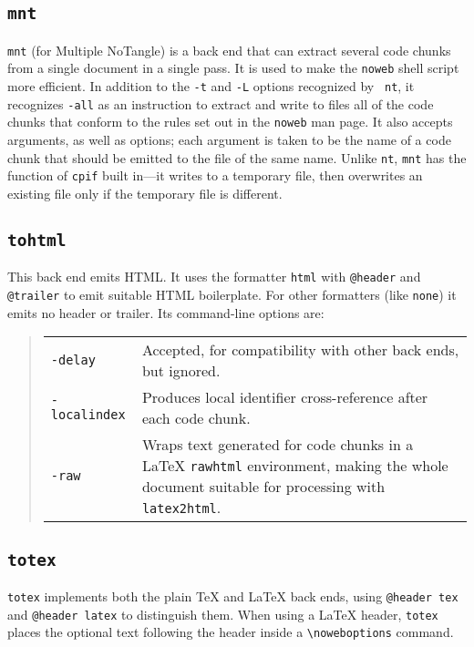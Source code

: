 \documentclass{article}
\makeatletter
\newcommand\kw[1]{\texttt{@#1}}
\makeatother
\begin{document}
\subsection{\tt mnt}

{\tt mnt} (for Multiple NoTangle) 
is a back end that can extract several code chunks from a
single document in a single pass.  It is used to make the {\tt noweb}
shell script more efficient.
In addition to the {\tt -t} and {\tt -L} options recognized by {\tt
nt}, it recognizes {\tt -all} as an instruction to extract and write
to files all of the code chunks that conform to the rules set out in
the {\tt noweb} man page.
It also accepts arguments, as well as options; each argument is taken
to be the name of a code chunk that should be emitted to the file of
the same name.
Unlike {\tt nt}, {\tt mnt} has the function of {\tt cpif} built
in---it writes to a temporary file, then overwrites an existing file
only if the temporary file is different.



\subsection{\tt tohtml}

This back end emits HTML.
It uses the formatter {\tt html} with \kw{header} and \kw{trailer} to
emit suitable HTML boilerplate.
For other formatters (like {\tt none}) it emits no header or trailer.
Its command-line options are:
\begin{quote}
\begin{tabularx}{\linewidth}{lX}
\tt -delay&Accepted, for compatibility with other back ends, but ignored.\\
\tt -localindex&Produces local identifier cross-reference after each code chunk.\\
\tt -raw&Wraps text generated for code chunks in a {\LaTeX} {\tt rawhtml}
environment, making the whole document suitable for processing with
{\tt latex2html}.\\
\end{tabularx}
\end{quote}


\subsection{\tt totex}

{\tt totex} implements both the plain {\TeX} and {\LaTeX} back ends,
using \kw{header tex} and \kw{header latex} to distinguish them.
When using a {\LaTeX} header, {\tt totex} places the optional text
following the header inside a \verb+\noweboptions+ command.
\end{document}
